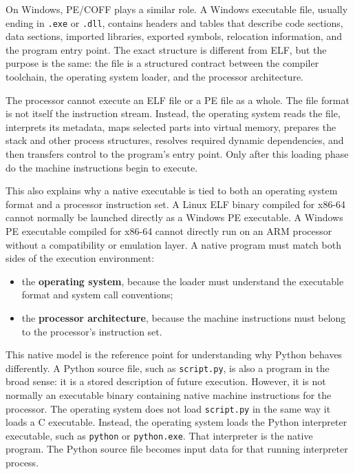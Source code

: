 \documentclass[a4paper,twoside]{report}
\begin{document}
On Windows, PE/COFF plays a similar role. A Windows executable file, usually ending in \texttt{.exe} or \texttt{.dll}, contains headers and tables that describe code sections, data sections, imported libraries, exported symbols, relocation information, and the program entry point. The exact structure is different from ELF, but the purpose is the same: the file is a structured contract between the compiler toolchain, the operating system loader, and the processor architecture.

The processor cannot execute an ELF file or a PE file as a whole. The file format is not itself the instruction stream. Instead, the operating system reads the file, interprets its metadata, maps selected parts into virtual memory, prepares the stack and other process structures, resolves required dynamic dependencies, and then transfers control to the program's entry point. Only after this loading phase do the machine instructions begin to execute.

This also explains why a native executable is tied to both an operating system format and a processor instruction set. A Linux ELF binary compiled for x86-64 cannot normally be launched directly as a Windows PE executable. A Windows PE executable compiled for x86-64 cannot directly run on an ARM processor without a compatibility or emulation layer. A native program must match both sides of the execution environment:

\begin{itemize}
    \item the \textbf{operating system}, because the loader must understand the executable format and system call conventions;
    \item the \textbf{processor architecture}, because the machine instructions must belong to the processor's instruction set.
\end{itemize}

This native model is the reference point for understanding why Python behaves differently. A Python source file, such as \texttt{script.py}, is also a program in the broad sense: it is a stored description of future execution. However, it is not normally an executable binary containing native machine instructions for the processor. The operating system does not load \texttt{script.py} in the same way it loads a C executable. Instead, the operating system loads the Python interpreter executable, such as \texttt{python} or \texttt{python.exe}. That interpreter is the native program. The Python source file becomes input data for that running interpreter process.
\end{document}
